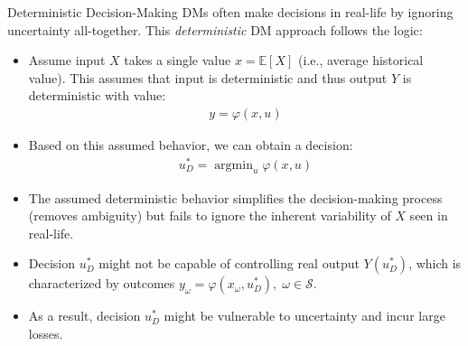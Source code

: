 \documentclass[handout,9pt]{beamer}
\begin{document}
%
\begin{frame}{Deterministic Decision-Making}
DMs often make decisions in real-life by ignoring uncertainty all-together. This {\em deterministic} DM approach follows the logic:
\begin{block}{}
\begin{itemize}
\item Assume input $X$ takes a single value $x={\mathbb{E}}[X]$ (i.e., average historical value). This assumes that input is deterministic and thus output $Y$ is deterministic with value:
\begin{align*}
y=\varphi(x,u)
\end{align*}
\item Based on this assumed behavior, we can obtain a decision: 
\begin{align*}
u_D^*=\mathop{\textrm{argmin}}_{u}\varphi (x,u)
\end{align*}
\end{itemize}
\end{block}
\begin{itemize}
\item The assumed deterministic behavior simplifies the decision-making process (removes ambiguity) but fails to ignore the inherent variability of $X$ seen in real-life. 

\item Decision $u_D^*$ might not be capable of controlling real output $Y(u_D^*)$, which is characterized by outcomes $y_\omega=\varphi(x_\omega,u_D^*),\; \omega \in \mathcal{S}$. 

\item As a result, decision $u_D^*$ might be vulnerable to uncertainty and incur large losses. 
\end{itemize}

\end{frame}
\end{document}
